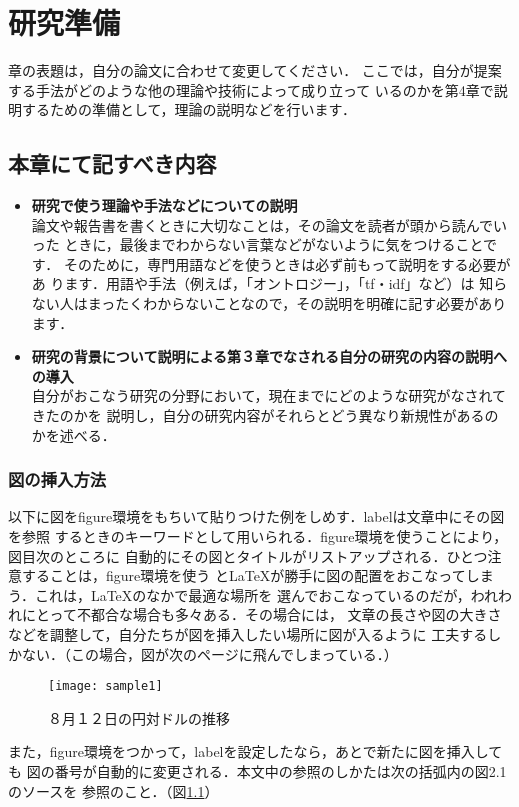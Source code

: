 \chapter{研究準備}
章の表題は，自分の論文に合わせて変更してください．
ここでは，自分が提案する手法がどのような他の理論や技術によって成り立って
いるのかを第4章で説明するための準備として，理論の説明などを行います．
\section{本章にて記すべき内容}
\begin{itemize}
\item {\bf 研究で使う理論や手法などについての説明}\\
論文や報告書を書くときに大切なことは，その論文を読者が頭から読んでいった
      ときに，最後までわからない言葉などがないように気をつけることです．
      そのために，専門用語などを使うときは必ず前もって説明をする必要があ
      ります．用語や手法（例えば，「オントロジー」，「tf・idf」など）は
知らない人はまったくわからないことなので，その説明を明確に記す必要があり
      ます．
\item {\bf 研究の背景について説明による第３章でなされる自分の研究の内容の説明への導入}\\
自分がおこなう研究の分野において，現在までにどのような研究がなされてきたのかを
説明し，自分の研究内容がそれらとどう異なり新規性があるのかを述べる．\\
\end{itemize}

\subsection{図の挿入方法}
以下に図をfigure環境をもちいて貼りつけた例をしめす．labelは文章中にその図を参照
するときのキーワードとして用いられる．figure環境を使うことにより，図目次のところに
自動的にその図とタイトルがリストアップされる．ひとつ注意することは，figure環境を使う
と\LaTeX が勝手に図の配置をおこなってしまう．これは，\LaTeX のなかで最適な場所を
選んでおこなっているのだが，われわれにとって不都合な場合も多々ある．その場合には，
文章の長さや図の大きさなどを調整して，自分たちが図を挿入したい場所に図が入るように
工夫するしかない．（この場合，図が次のページに飛んでしまっている．）

\begin{center}
\begin{figure}[htbp]
\texttt{[image: sample1]}
\caption{８月１２日の円対ドルの推移}
\label{fig:exchange0812}
\end{figure}
\end{center}

また，figure環境をつかって，labelを設定したなら，あとで新たに図を挿入しても
図の番号が自動的に変更される．本文中の参照のしかたは次の括弧内の図2.1のソースを
参照のこと．（図\ref{fig:exchange0812}）